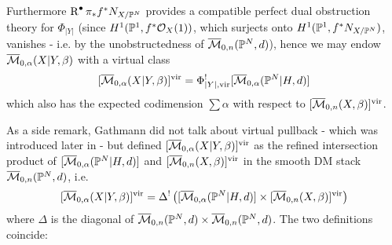 Furthermore $\operatorname{R}^\bullet\pi_*f^*N_{X/\mathbb P^N}$ provides a compatible perfect dual obstruction theory for $\Phi_{\lvert Y\rvert}$ (since $H^1(\mathbb P^1,f^*\mathcal{O}_X(1))$, which surjects onto $H^1(\mathbb P^1,f^*N_{X/\mathbb P^N})$, vanishes - i.e. by the unobstructedness of $\overline{\mathcal{M}}_{0,n}(\mathbb P^N,d)$), hence we may endow $\overline{\mathcal{M}}_{0,\alpha}(X|Y,\beta)$ with a virtual class
\[ [\overline{\mathcal{M}}_{0,\alpha}(X|Y,\beta)]^{\mathrm{vir}}=\Phi_{\lvert Y\rvert,\rm{vir}}^![\overline{\mathcal{M}}_{0,\alpha}(\mathbb P^N|H,d)] \]
which also has the expected codimension $\sum\alpha$ with respect to $[\overline{\mathcal{M}}_{0,n}(X,\beta)]^{\mathrm{vir}}$.

As a side remark, Gathmann did not talk about virtual pullback - which was introduced later in \cite{Manolache-Pull} - but defined $[\overline{\mathcal{M}}_{0,\alpha}(X|Y,\beta)]^{\mathrm{vir}}$ as the refined intersection product of $[\overline{\mathcal{M}}_{0,\alpha}(\mathbb P^N|H,d)]$ and $[\overline{\mathcal{M}}_{0,n}(X,\beta)]^{\mathrm{vir}}$ in the smooth DM stack $\overline{\mathcal{M}}_{0,n}(\mathbb P^N,d)$, i.e. \[[\overline{\mathcal{M}}_{0,\alpha}(X|Y,\beta)]^{\mathrm{vir}}=\Delta^!\left([\overline{\mathcal{M}}_{0,\alpha}(\mathbb P^N|H,d)]\times [\overline{\mathcal{M}}_{0,n}(X,\beta)]^{\mathrm{vir}}\right)\] where $\Delta$ is the diagonal of $\overline{\mathcal{M}}_{0,n}(\mathbb P^N,d)\times \overline{\mathcal{M}}_{0,n}(\mathbb P^N,d)$. The two definitions coincide:
 
